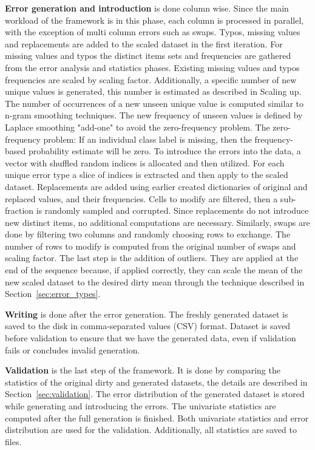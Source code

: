 \textbf{Error generation and introduction} is done column wise. 
Since the main workload of the framework is in this phase, each column is processed in parallel, with the exception of multi column errors such as swaps.
Typos, missing values and replacements are added to the scaled dataset in the first iteration.
For missing values and typos the distinct items sets and frequencies are gathered from the error analysis and statistics phases. 
Existing missing values and typos frequencies are scaled by scaling factor. Additionally, a specific number of new unique values is generated, this number is estimated as described in Scaling up.
The number of occurrences of a new unseen unique value is computed similar to n-gram smoothing techniques. 
The new frequency of unseen values is defined by Laplace smoothing "add-one" to avoid the zero-frequency problem.
The zero-frequency problem: If an individual class label is missing, then the frequency-based probability estimate will be zero.
To introduce the errors into the data, a vector with shuffled random indices is allocated and then utilized. 
For each unique error type a slice of indices is extracted and then apply to the scaled dataset.
Replacements are added using earlier created dictionaries of original and replaced values, and their frequencies.
Cells to modify are filtered, then a sub-fraction is randomly sampled and corrupted.
Since replacements do not introduce new distinct items, no additional computations are necessary. 
Similarly, swaps are done by filtering two columns and randomly choosing rows to exchange. 
The number of rows to modify is computed from the original number of swaps and scaling factor.
The last step is the addition of outliers. 
They are applied at the end of the sequence because, if applied correctly, they can scale the mean of the new scaled dataset to the desired dirty mean through the technique described in Section~\ref{sec:error_types}. 


\textbf{Writing} is done after the error generation. 
The freshly generated dataset is saved to the disk in comma-separated values (CSV) format. 
Dataset is saved before validation to ensure that we have the generated data, even if validation fails or concludes invalid generation.


\textbf{Validation} is the last step of the framework. It is done by comparing the statistics of the original dirty and generated datasets, the details are described in Section~\ref{sec:validation}.
The error distribution of the generated dataset is stored while generating and introducing the errors.
The univariate statistics are computed after the full generation is finished.
Both univariate statistics and error distribution are used for the validation. 
Additionally, all statistics are saved to files.

